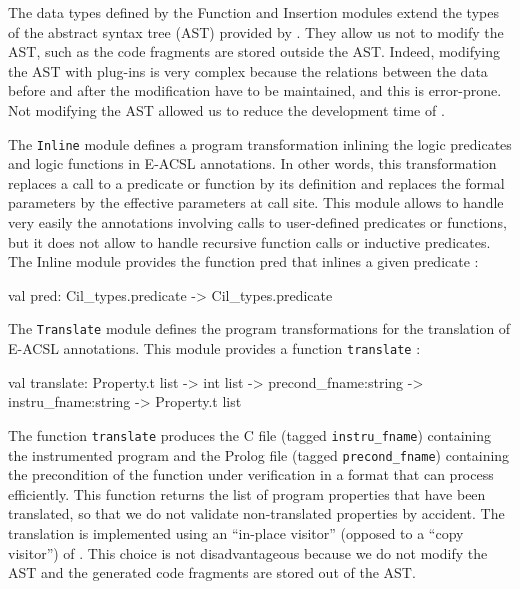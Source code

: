 \documentclass[web]{frama-c-book}
\begin{document}
The data types defined by the Function and Insertion modules extend the types of the abstract syntax tree (AST) provided by \framac. They allow us not to modify the AST, such as the code fragments are stored outside the AST. Indeed, modifying the AST with \framac plug-ins is very complex because the relations between the data before and after the modification have to be maintained, and this is error-prone. Not modifying the AST allowed us to reduce the development time of \stady.

The \lstinline[language=OCaml]'Inline' module defines a program transformation inlining the logic predicates and logic functions in E-ACSL annotations. In other words, this transformation replaces a call to a predicate or function by its definition and replaces the formal parameters by the effective parameters at call site. This module allows to  handle very easily the annotations involving calls to user-defined predicates or functions, but it does not allow to handle recursive function calls or inductive predicates. The Inline module provides the function pred that inlines a given predicate :

\begin{ocamlcode}
  val pred: Cil_types.predicate -> Cil_types.predicate
\end{ocamlcode}

The \lstinline[language=OCaml]'Translate' module defines the program transformations for the translation of E-ACSL annotations. This module provides a function \lstinline[language=OCaml]'translate' :

\begin{ocamlcode}
  val translate:
    Property.t list -> int list -> precond_fname:string -> instru_fname:string
    -> Property.t list
\end{ocamlcode}

The function \lstinline[language=OCaml]'translate' produces the C file (tagged \lstinline[language=OCaml]'instru_fname') containing the instrumented program and the Prolog file (tagged \lstinline[language=OCaml]'precond_fname') containing the precondition of the function under verification in a format that \pathcrawler can process efficiently. This function returns the list of program properties that have been translated, so that we do not validate non-translated properties by accident. The translation is implemented using an ``in-place visitor'' (opposed to a ``copy visitor'') of \framac. This choice is not disadvantageous because we do not modify the AST and the generated code fragments are stored out of the AST.
\end{document}
